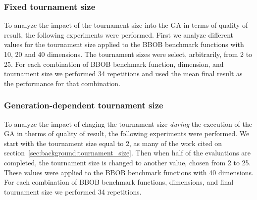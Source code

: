 \subsubsection*{Fixed tournament size}

To analyze the impact of the tournament size into the GA in terms of quality of result, the following experiments were performed. First we analyze different values for the tournament size applied to the BBOB benchmark functions with 10, 20 and 40 dimensions. The tournament sizes were select, arbitrarily, from 2 to 25. For each combination of BBOB benchmark function, dimension, and tournament size we performed 34 repetitions and used the mean final result as the performance for that combination.


\subsubsection*{Generation-dependent tournament size}

To analyze the impact of chaging the tournament size \textit{during} the execution of the GA in therms of quality of result, the following experiments were performed. We start with the tournament size equal to 2, as many of the work cited on section~\ref{sec:background:tournament_size}. Then when half of the evaluations are completed, the tournament size is changed to another value, chosen from 2 to 25. These values were applied to the BBOB benchmark functions with 40 dimensions. For each combination of BBOB benchmark functions, dimensions, and final tournament size we performed 34 repetitions.


